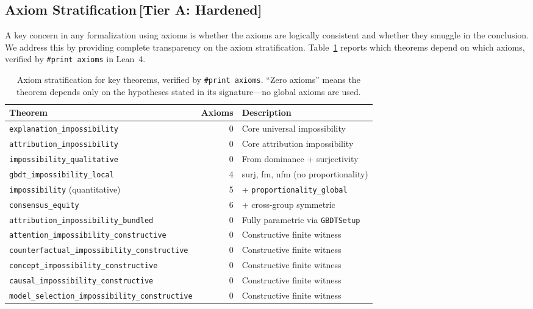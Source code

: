 \documentclass[11pt,a4paper]{article}
\begin{document}
\subsection{Axiom Stratification\,\textnormal{\normalsize[Tier A: Hardened]}}
\label{sec:axiom-stratification}

A key concern in any formalization using axioms is whether the axioms are
logically consistent and whether they smuggle in the conclusion.  We address
this by providing complete transparency on the axiom stratification.
Table~\ref{tab:axiom-strat} reports which theorems depend on which axioms,
verified by \texttt{\#print axioms} in Lean~4.

\begin{table}[ht]
\centering
\caption{Axiom stratification for key theorems, verified by \texttt{\#print axioms}.
  ``Zero axioms'' means the theorem depends only on the hypotheses stated in its
  signature---no global axioms are used.}
\label{tab:axiom-strat}
\footnotesize
\begin{tabular}{@{}lrl@{}}
\toprule
Theorem & Axioms & Description \\
\midrule
\texttt{explanation\_impossibility} & 0 & Core universal impossibility \\
\texttt{attribution\_impossibility} & 0 & Core attribution impossibility \\
\texttt{impossibility\_qualitative} & 0 & From dominance + surjectivity \\
\texttt{gbdt\_impossibility\_local} & 4 & surj, fm, nfm (no proportionality) \\
\texttt{impossibility} (quantitative) & 5 & + \texttt{proportionality\_global} \\
\texttt{consensus\_equity} & 6 & + cross-group symmetric \\
\texttt{attribution\_impossibility\_bundled} & 0 & Fully parametric via \texttt{GBDTSetup} \\
\texttt{attention\_impossibility\_constructive} & 0 & Constructive finite witness \\
\texttt{counterfactual\_impossibility\_constructive} & 0 & Constructive finite witness \\
\texttt{concept\_impossibility\_constructive} & 0 & Constructive finite witness \\
\texttt{causal\_impossibility\_constructive} & 0 & Constructive finite witness \\
\texttt{model\_selection\_impossibility\_constructive} & 0 & Constructive finite witness \\

\end{tabular}
\end{table}
\end{document}
